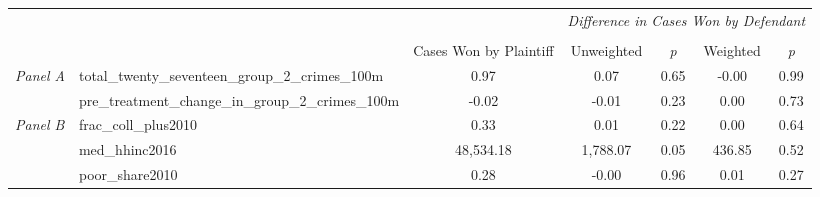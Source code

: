 \begin{tabular}{llccccc}
\toprule
 &  & \textit{} & \multicolumn{4}{c}{\textit{Difference in Cases Won by Defendant}} \\
\cline{4-7}
\\
 &  & Cases Won by Plaintiff & Unweighted & \emph{p} & Weighted & \emph{p} \\
\midrule
\multirow[c]{2}{3cm}{\textit{Panel A}} & total_twenty_seventeen_group_2_crimes_100m & 0.97 & 0.07 & 0.65 & -0.00 & 0.99 \\
 & pre_treatment_change_in_group_2_crimes_100m & -0.02 & -0.01 & 0.23 & 0.00 & 0.73 \\
\cline{1-7}
\multirow[c]{3}{3cm}{\textit{Panel B}} & frac_coll_plus2010 & 0.33 & 0.01 & 0.22 & 0.00 & 0.64 \\
 & med_hhinc2016 & 48,534.18 & 1,788.07 & 0.05 & 436.85 & 0.52 \\
 & poor_share2010 & 0.28 & -0.00 & 0.96 & 0.01 & 0.27 \\
\cline{1-7}
\bottomrule
\end{tabular}
